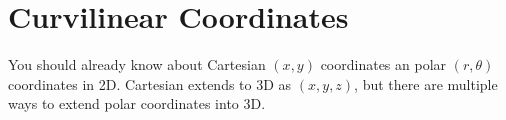 \chapter{Curvilinear Coordinates}
\noindent
You should already know about Cartesian $(x,y)$ coordinates an polar $(r,\theta)$ coordinates in 2D. Cartesian extends to 3D as $(x,y,z)$, but there are multiple ways to extend polar coordinates into 3D.\\



